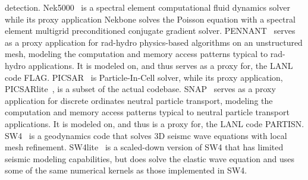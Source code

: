 detection. 
%
Nek5000~\cite{Nek5000} is a spectral element computational fluid dynamics
solver while its proxy application Nekbone solves the Poisson equation with
a spectral element multigrid preconditioned conjugate gradient solver.  
%
PENNANT~\cite{pennant} serves as a proxy application for rad-hydro physics-based algorithms on an unstructured mesh, modeling the computation and memory access patterns typical to rad-hydro applications. It is modeled on, and thus serves as a proxy for, the LANL code FLAG.
%
PICSAR~\cite{PICSAR} is Particle-In-Cell solver, while its proxy
application, PICSARlite~\cite{picsarlite}, is a subset of the actual codebase.  
%
SNAP~\cite{snap} serves as a proxy application for discrete ordinates neutral particle transport, modeling the computation and memory access patterns typical to neutral particle transport applications. It is modeled on, and thus is a proxy for, the LANL code PARTISN.
%
SW4~\cite{SW42} is a geodynamics code that solves 3D seismc wave equations with local mesh refinement.
SW4lite~\cite{ECPProxySuite1} is a scaled-down version of SW4 that has limited seismic modeling capabilities, but does solve the elastic wave equation and uses some of the same numerical kernels as those implemented in SW4.  %
